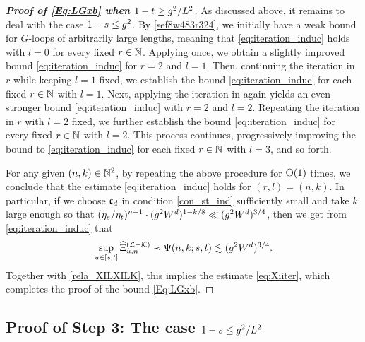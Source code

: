 \begin{proof}[\bf Proof of \eqref{Eq:LGxb} when $1-t\ge g^2/L^{2}$]
As discussed above, it remains to deal with the case $1-s \le g^2$. By \eqref{sef8w483r324}, we initially have a weak bound for $G$-loops of arbitrarily large lengths, meaning that \eqref{eq:iteration_induc} holds with $l=0$ for every fixed $r\in \mathbb{N}$. Applying  once, we obtain a slightly improved bound \eqref{eq:iteration_induc} for $r=2$ and $l=1$. Then, continuing the iteration in $r$ while keeping $l=1$ fixed, we establish the bound \eqref{eq:iteration_induc} for each fixed $r\in \mathbb{N}$ with $l=1$. 
Next, applying the iteration in  again yields an even stronger bound \eqref{eq:iteration_induc} with $r=2$ and $l=2$. Repeating the iteration in $r$ with $l=2$ fixed, we further establish the bound \eqref{eq:iteration_induc} for every fixed $r\in \mathbb{N}$ with $l=2$. This process continues, progressively improving the bound to \eqref{eq:iteration_induc} for each fixed $r\in \mathbb{N}$ with $l=3$, and so forth.

For any given $(n,k)\in \mathbb{N}^2$, by repeating the above procedure for $\operatorname{O}(1)$ times, we conclude that the estimate \eqref{eq:iteration_induc} holds for $(r,l)=(n,k)$.  
In particular, if we choose ${\mathfrak c}_d$ in condition \eqref{con_st_ind} sufficiently small and take $k$ large enough so that $(\eta_s/\eta_t)^{n-1}\cdot  (g^2W^{d})^{1-k/8} \ll (g^2W^{d})^{3/4}$, then we get from \eqref{eq:iteration_induc} that 
\begin{equation}\label{eq:iterative_pf_largeeta}\sup_{u\in[s,t]}\widehat\Xi^{({\mathcal L-\mathcal K})}_{u,n}\prec \Psi(n,k;s,t) \lesssim (g^2W^{d})^{3/4}.\end{equation}
Together with \eqref{rela_XILXILK}, this implies the estimate \eqref{eq:Xiiter}, %
which completes the proof of the bound \eqref{Eq:LGxb}.
\end{proof}



\subsection{Proof of Step 3: The case \texorpdfstring{$1-s \le g^2/L^{2}$}{1-s <= L-2}}\label{sec:1-s<L-2}



